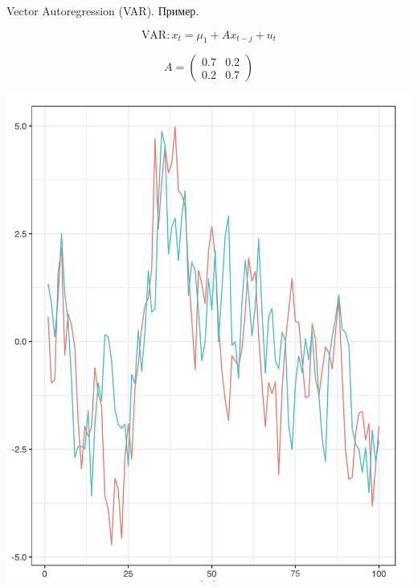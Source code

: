 \begin{frame}{Vector Autoregression (VAR). Пример.}
\noindent
\begin{minipage}{0.4\textwidth}
    $$\text{VAR}: x_t = \mu_1 + A x_{t-j} + u_t $$

    \vspace{0.3cm}
    $$A = \begin{pmatrix}
            0.7 & 0.2 \\
            0.2 & 0.7
            \end{pmatrix}
    $$
    
    \vspace{0.3cm}
\end{minipage}
\hfill
\begin{minipage}{0.5\textwidth}\raggedleft
    \includegraphics[width=0.9\linewidth]{lecture_3/fig/var_example.png}
\end{minipage}
\end{frame}

